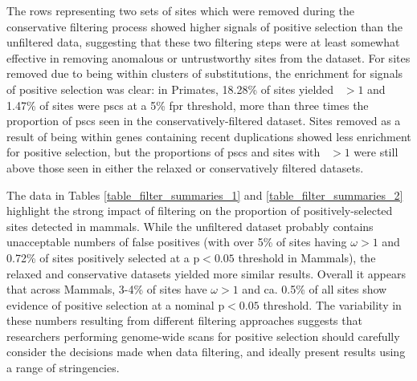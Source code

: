 The rows representing two sets of sites which were removed during the
conservative filtering process showed higher signals of positive
selection than the unfiltered data, suggesting that these two
filtering steps were at least somewhat effective in removing anomalous
or untrustworthy sites from the dataset. For sites removed due to
being within clusters of \nsyn substitutions, the enrichment for
signals of positive selection was clear: in Primates, 18.28\% of sites
yielded \omgml~$>1$ and 1.47\% of sites were \acp{psc} at a 5\%
\ac{fpr} threshold, more than three times the proportion of \acp{psc}
seen in the conservatively-filtered dataset. Sites removed as a result
of being within genes containing recent duplications showed less
enrichment for positive selection, but the proportions of \acp{psc}
and sites with \omgml~$>1$ were still above those seen in either the
relaxed or conservatively filtered datasets.


The data in Tables \ref{table_filter_summaries_1} and
\ref{table_filter_summaries_2} highlight the strong impact of
filtering on the proportion of positively-selected sites detected in
mammals. While the unfiltered dataset probably contains unacceptable
numbers of false positives (with over 5\% of sites having $\omega>1$
and 0.72\% of sites positively selected at a p$<0.05$ threshold in
Mammals), the relaxed and conservative datasets yielded more similar
results. Overall it appears that across Mammals, 3-4\% of sites have
$\omega>1$ and ca. 0.5\% of all sites show evidence of positive
selection at a nominal p$<0.05$ threshold. The variability in these
numbers resulting from different filtering approaches suggests that
researchers performing genome-wide scans for positive selection should
carefully consider the decisions made when data filtering, and ideally
present results using a range of stringencies.


